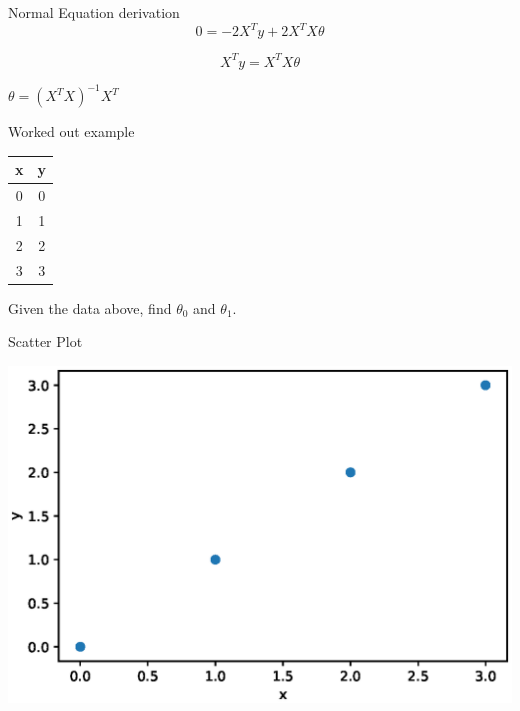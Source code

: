 \documentclass{beamer}
\begin{document}
\begin{frame}{Normal Equation derivation}
$$
    0 = -2X^{T}y + 2X^{T}X\theta
$$

$$
    X^{T}y  = X^{T}X\theta
$$

\begin{tcolorbox}
\begin{center}
    

        $\theta = (X^{T}X)^{-1}X^{T}$
\end{center}
\end{tcolorbox}

\end{frame}

\begin{frame}{Worked out example}
    \begin{center}
 \begin{tabular}{||c c||} 
 \hline
 x  & y \\ [0.5ex] 
 \hline\hline
 0 & 0 \\
 1 & 1 \\
 2 & 2 \\
 3 & 3 \\
 \hline
\end{tabular}
\end{center}

Given the data above, find $\theta_{0}$ and $\theta_{1}$.

\end{frame}


\begin{frame}{Scatter Plot}
\begin{center}
            \includegraphics[totalheight=6cm]{linear-reg/scatterplot-2.eps}
\end{center}
    
\end{frame}
\end{document}
